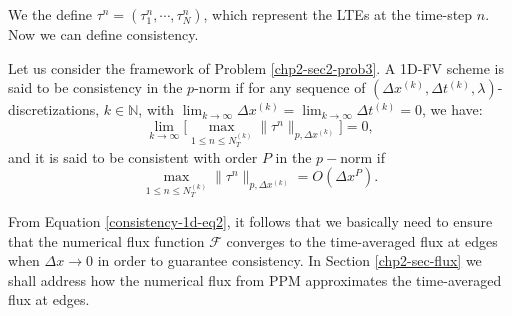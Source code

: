 We the define $\tau^n = (\tau_1^n, \cdots, \tau^n_N)$, which represent the LTEs at the time-step $n$.
Now we can define consistency.
\begin{definition}[Consistency]
	\label{chp2-def-cons}
	Let us consider the framework of Problem \ref{chp2-sec2-prob3}.
	A 1D-FV scheme is said to be consistency in the $p$-norm if for any sequence of $(\Delta x^{(k)}, \Delta t^{(k)},\lambda)$-discretizations, 
	$k \in \mathbb{N}$, with $\lim_{k\to \infty }{\Delta x^{(k)}} = \lim_{k\to \infty }{\Delta t^{(k)}} = 0$, we have:
	\begin{equation*}
		\lim_{k \to \infty}\bigg[ {\max_{1\leq n\leq N_T^{(k)}}}{\|\tau^n\|_{p,\Delta x^{(k)}}} \bigg] = 0,
	\end{equation*}
	and it is said to be consistent with order $P$ in the $p-$norm if %
	\begin{equation*}
		{\max_{1\leq n\leq N_T^{(k)}}}{\|\tau^n\|_{p,\Delta x^{(k)}}} = O(\Delta x^P).
	\end{equation*}
\end{definition}
From Equation \eqref{consistency-1d-eq2}, it follows that we basically need to ensure that 
the numerical flux function $\mathcal{F}$ converges to the time-averaged flux at edges
when $\Delta x \to 0$ in order to guarantee consistency.
In Section \ref{chp2-sec-flux} we shall address how the numerical flux from PPM
approximates the time-averaged flux at edges.

